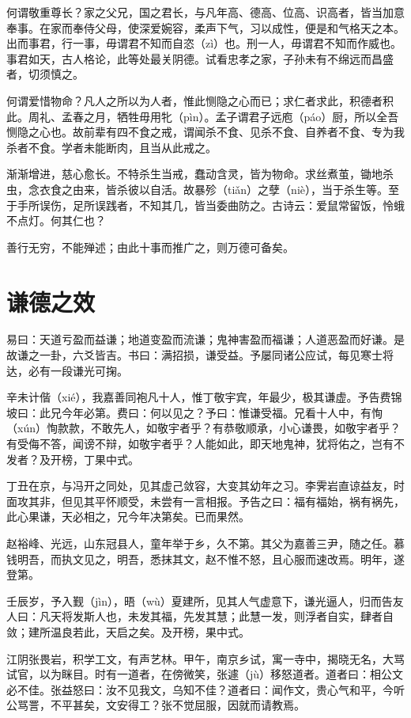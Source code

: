 \documentclass[12pt,UTF8]{ctexbook}
\begin{document}
何谓敬重尊长？家之父兄，国之君长，与凡年高、德高、位高、识高者，皆当加意奉事。在家而奉侍父母，使深爱婉容，柔声下气，习以成性，便是和气格天之本。出而事君，行一事，毋谓君不知而自恣（zì）也。刑一人，毋谓君不知而作威也。事君如天，古人格论，此等处最关阴德。试看忠孝之家，子孙未有不绵远而昌盛者，切须慎之。

何谓爱惜物命？凡人之所以为人者，惟此恻隐之心而已；求仁者求此，积德者积此。周礼、孟春之月，牺牲毋用牝（pìn）。孟子谓君子远庖（páo）厨，所以全吾恻隐之心也。故前辈有四不食之戒，谓闻杀不食、见杀不食、自养者不食、专为我杀者不食。学者未能断肉，且当从此戒之。

渐渐增进，慈心愈长。不特杀生当戒，蠢动含灵，皆为物命。求丝煮茧，锄地杀虫，念衣食之由来，皆杀彼以自活。故暴殄（tiǎn）之孽（niè），当于杀生等。至于手所误伤，足所误践者，不知其几，皆当委曲防之。古诗云：爱鼠常留饭，怜蛾不点灯。何其仁也？

善行无穷，不能殚述；由此十事而推广之，则万德可备矣。

\chapter{谦德之效}

易曰：天道亏盈而益谦；地道变盈而流谦；鬼神害盈而福谦；人道恶盈而好谦。是故谦之一卦，六爻皆吉。书曰：满招损，谦受益。予屡同诸公应试，每见寒士将达，必有一段谦光可掬。

辛未计偕（xié），我嘉善同袍凡十人，惟丁敬宇宾，年最少，极其谦虚。予告费锦坡曰：此兄今年必第。费曰：何以见之？予曰：惟谦受福。兄看十人中，有恂（xún）恂款款，不敢先人，如敬宇者乎？有恭敬顺承，小心谦畏，如敬宇者乎？有受侮不答，闻谤不辩，如敬宇者乎？人能如此，即天地鬼神，犹将佑之，岂有不发者？及开榜，丁果中式。

丁丑在京，与冯开之同处，见其虚己敛容，大变其幼年之习。李霁岩直谅益友，时面攻其非，但见其平怀顺受，未尝有一言相报。予告之曰：福有福始，祸有祸先，此心果谦，天必相之，兄今年决第矣。已而果然。

赵裕峰、光远，山东冠县人，童年举于乡，久不第。其父为嘉善三尹，随之任。慕钱明吾，而执文见之，明吾，悉抹其文，赵不惟不怒，且心服而速改焉。明年，遂登第。

壬辰岁，予入觐（jìn），晤（wù）夏建所，见其人气虚意下，谦光逼人，归而告友人曰：凡天将发斯人也，未发其福，先发其慧；此慧一发，则浮者自实，肆者自敛；建所温良若此，天启之矣。及开榜，果中式。

江阴张畏岩，积学工文，有声艺林。甲午，南京乡试，寓一寺中，揭晓无名，大骂试官，以为眯目。时有一道者，在傍微笑，张遽（jù）移怒道者。道者曰：相公文必不佳。张益怒曰：汝不见我文，乌知不佳？道者曰：闻作文，贵心气和平，今听公骂詈，不平甚矣，文安得工？张不觉屈服，因就而请教焉。
\end{document}
